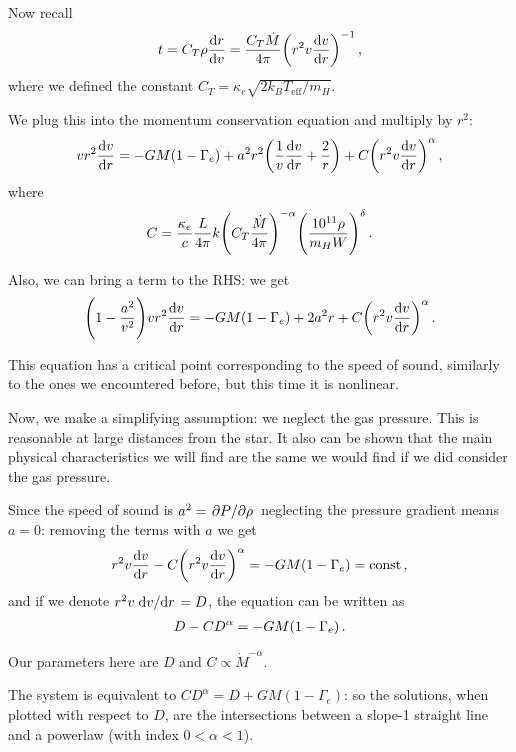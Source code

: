 \documentclass[main.tex]{subfiles}
\begin{document}
Now recall 
%
\begin{align}
  t = C_T \rho \dv{r}{v} = \frac{C_T \dot{M}}{4 \pi } \qty(r^2 v \dv{v}{r})^{-1}
\,,
\end{align}
%
where we defined the constant \(C_T = \kappa_{e} \sqrt{2 k_B T _{\text{eff}} / m_H}\).

We plug this into the momentum conservation equation and multiply by \(r^2\): 
%
\begin{align}
    v r^2 \dv{v}{r} =
    - GM (1 - \Gamma_{e})
    + a^2 r^2 \qty(\frac{1}{v} \dv{v}{r} + \frac{2}{r}) 
    + C \qty(r^2 v \dv{v}{r})^{\alpha } 
\,,
\end{align}
%
where 
%
\begin{align}
  C = \frac{\kappa_{e}}{c} \frac{L}{4 \pi} k \qty(C_T \frac{\dot{M}}{4 \pi })^{-\alpha } \qty(\frac{\num{e11} \rho }{m_H W })^{ \delta }
\,. 
\end{align}

Also, we can bring a term to the RHS: we get 
%
\begin{align}
    \qty(1 - \frac{a^2}{v^2}) v r^2 \dv{v}{r} =
    - GM (1 - \Gamma_{e})
    + 2a^2 r 
    + C \qty(r^2 v \dv{v}{r})^{\alpha } 
\,.
\end{align}
%

This equation has a critical point corresponding to the speed of sound, similarly to the ones we encountered before, but this time it is nonlinear.

Now, we make a simplifying assumption: we neglect the gas pressure. This is reasonable at large distances from the star.
It also can be shown that the main physical characteristics we will find are the same we would find if we did consider the gas pressure. 

Since the speed of sound is \(a^2 = \pdv*{P}{\rho }\) neglecting the pressure gradient means \(a=0\): removing  the terms with \(a\) we get 
%
\begin{align}
  r^2 v \dv{v}{r} - C \qty(r^2 v \dv{v}{r})^{\alpha } 
  = - GM (1 - \Gamma_{e}) = \text{const}
\,,
\end{align}
%
and if we denote \(r^2  v \dv*{v}{r} = D\), the equation can be written as 
%
\begin{align}
  D - C D^{\alpha } = - GM \qty(1 - \Gamma_e)
\,.
\end{align}

Our parameters here are \(D\) and \(C \propto \dot{M}^{-\alpha }\).

The system is equivalent to \(CD^{\alpha } = D + GM(1-\Gamma_{e})\): so the solutions, when plotted with respect to \(D\), are the intersections between a slope-1 straight line and a powerlaw (with index \(0 < \alpha <1\)). 
\end{document}
